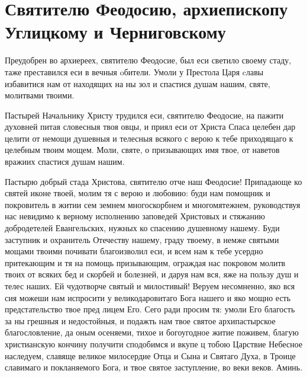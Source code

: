 \section{Святителю Феодосию, архиепископу Углицкому и  Черниговскому}\begin{mymulticols}


Преудобрен во архиереех, святителю Феодосие, был еси светило своему стаду, таже преставился еси в вечныя oбители. Умоли у Престола Царя cлавы избавитися нам от находящих на ны зол и спастися душам нашим, святе, молитвами твоими.


Пастырей Начальнику Христу трудился еси, святителю Феодосие, на пажити духовней питая словесныя твоя овцы, и приял еси от Христа Спаса целебен дар целити от немощи душевныя и телесныя всякого с верою к тебе приходящаго к целебным твоим мощем. Моли, святе, о призывающих имя твое, от наветов вражиих спастися душам нашим.


Пастырю добрый стада Христова, святителю отче наш Феодосие! Припадающе ко святей иконе твоей, молим тя с верою и любовию: буди нам помощник и покровитель в житии сем земнем многоскорбнем и многомятежнем, руководствуя нас невидимо к верному исполнению заповедей Христовых и стяжанию добродетелей Евангельских, нужных ко спасению душевному нашему. Буди заступник и охранитель Отечеству нашему, граду твоему, в немже святыми мощами твоими почивати благоизволил еси, и всем нам к тебе усердно притекающим и тя на помощь призывающим, ограждая нас покровом молитв твоих от всяких бед и скорбей и болезней, и даруя нам вся, яже на пользу душ и телес наших. Ей чудотворче святый и милостивый! Веруем несомненно, яко вся сия можеши нам испросити  у великодаровитаго Бога нашего и яко мощно есть предстательство твое пред лицем Его. Сего ради просим тя: умоли Его благость за ны грешныя и недостойныя, и подажть нам твое святое архипастырское благословление, да оным осеняеми, тихое и богоугодное житие поживем, благую христианскую кончину получити сподобимся и вкупе ц тобою Царствие Небесное наследуем, славяще великое милосердие Отца и Сына и Святаго Духа, в Троице славимаго и покланяемого Бога, и твое святое заступление, во веки веков. Аминь.

\end{mymulticols}

